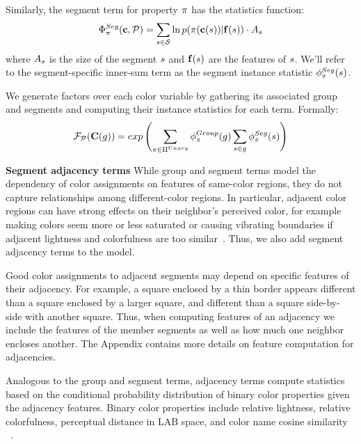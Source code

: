 Similarly, the segment term for property $\pi$ has the statistics function:
 \begin{equation*}
 \Phi^{Seg}_\pi(\mathbf{c}, \mathcal{P}) = \sum_{s \in \mathcal{S}} \ln p( \pi( \mathbf{c}(s) ) | \mathbf{f}(s)) \cdot A_s
 \end{equation*}
where $A_s$ is the size of the segment $s$ and $\mathbf{f}(s)$ are the features of $s$. We'll refer to the segment-specific inner-sum term as the segment instance statistic $\phi^{Seg}_\pi(s)$.

We generate factors over each color variable by gathering its associated group and segments and computing their instance statistics for each term. Formally:
 \begin{equation*}
 \mathcal{F}_{\mathcal{P}}(\mathbf{C}(g)) = exp\left(\sum_{\pi \in \Pi^{Unary}} \phi^{Group}_\pi(g) \sum_{s \in g} \phi^{Seg}_\pi(s)\right) 
 \end{equation*}

\textbf{Segment adjacency terms}
While group and segment terms model the dependency of color assignments on features of same-color regions, they do not capture relationships among different-color regions. In particular, adjacent color regions can have strong effects on their neighbor's perceived color, for example making colors seem more or less saturated or causing vibrating boundaries if adjacent lightness and colorfulness are too similar~\cite{AlbersInteractionOfColor}. Thus, we also add segment adjacency terms to the model.

Good color assignments to adjacent segments may depend on specific features of their adjacency. For example, a square enclosed by a thin border appears different than a square enclosed by a larger square, and different than a square side-by-side with another square. Thus, when computing features of an adjacency we include the features of the member segments as well as how much one neighbor encloses another. The Appendix contains more details on feature computation for adjacencies.~ 

Analogous to the group and segment terms, adjacency terms compute statistics based on the conditional probability distribution of binary color properties given the adjacency features. Binary color properties include relative lightness, relative colorfulness, perceptual distance in LAB space, and color name cosine similarity ~\cite{ColorNamingModels}.

